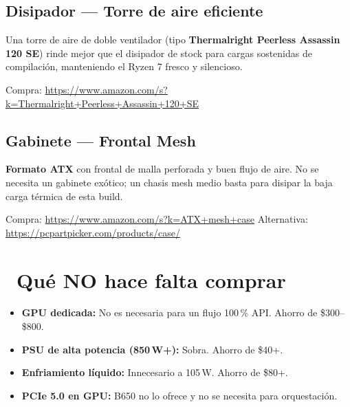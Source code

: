 \documentclass[11pt,a4paper]{article}
\newcommand{\iconotexto}[2]{\textcolor{cyanNeon}{\faIcon{#1}}~#2}
\begin{document}
\subsection{Disipador --- Torre de aire eficiente}
\label{link-cooler}
\begin{tcolorbox}[cajaRecomendacion, title={\faIcon{fan}~Cooler}]
Una torre de aire de doble ventilador (tipo \textbf{Thermalright Peerless Assassin 120 SE}) rinde mejor que el disipador de stock para cargas sostenidas de compilaci\'on, manteniendo el Ryzen 7 fresco y silencioso.

Compra: \url{https://www.amazon.com/s?k=Thermalright+Peerless+Assassin+120+SE}
\end{tcolorbox}

\subsection{Gabinete --- Frontal Mesh}
\label{link-case}
\begin{tcolorbox}[cajaRecomendacion, title={\faIcon{box-open}~Case}]
\textbf{Formato ATX} con frontal de malla perforada y buen flujo de aire. No se necesita un gabinete ex\'otico; un chasis mesh medio basta para disipar la baja carga t\'ermica de esta build.

Compra: \url{https://www.amazon.com/s?k=ATX+mesh+case}
Alternativa: \url{https://pcpartpicker.com/products/case/}
\end{tcolorbox}

\section[Qu\'e NO comprar]{\iconotexto{ban}{Qu\'e NO hace falta comprar}}

\begin{tcolorbox}[cajaMejora, title={\faIcon{exclamation-circle}~Ahorros conscientes}]
\begin{itemize}
    \item \textbf{GPU dedicada:} No es necesaria para un flujo 100\,\% API. Ahorro de \$300--\$800.
    \item \textbf{PSU de alta potencia (850\,W+):} Sobra. Ahorro de \$40+.
    \item \textbf{Enfriamiento l\'iquido:} Innecesario a 105\,W. Ahorro de \$80+.
    \item \textbf{PCIe 5.0 en GPU:} B650 no lo ofrece y no se necesita para orquestaci\'on.
\end{itemize}
\end{tcolorbox}
\end{document}
